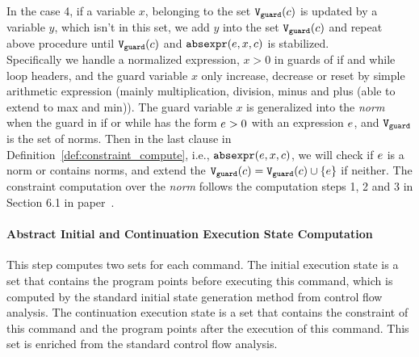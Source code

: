 %
In the case 4, if a variable $x$, belonging to the set 
  $\mathtt{V}_{\mathtt{guard}}(c)$ is updated by a variable $y$, which isn't in this set, 
  we add $y$ into the set $\mathtt{V}_{\mathtt{guard}}(c)$ and repeat 
  above procedure  until $\mathtt{V}_{\mathtt{guard}}(c)$ and $\mathtt{abs}{\mathtt{expr}}(e, x, c)$ is stabilized. 
  \\
Specifically 
we handle a 
normalized expression, $x > 0$
in guards of if and while loop headers, and 
the guard variable $x$ only increase, decrease or reset by 
simple arithmetic expression (mainly multiplication, division, minus and plus (able to extend to max and min)). 
The guard variable $x$ is generalized into the \emph{norm} when the guard 
in if or while has the form $e > 0$ with an expression $e$, and $\mathtt{V}_{\mathtt{guard}}$ is the set of norms.
Then in the last clause in Definition~\ref{def:constraint_compute}, i.e., $\mathtt{abs}{\mathtt{expr}}(e, x, c)$,
we will check if $e$ is a norm or contains norms, and extend the $\mathtt{V}_{\mathtt{guard}}(c)= \mathtt{V}_{\mathtt{guard}}(c)\cup \{e\}$ if neither.
The constraint computation over the \emph{norm} follows the computation steps 1, 2 and 3 in Section 6.1 in paper~\cite{SinnZV17}. 
%
\paragraph{Abstract Initial and Continuation Execution State Computation}
This step computes two sets for each command. 
The initial execution state is a set that contains the
program points before executing this command, which is computed by the standard initial state generation method from control flow analysis.
The continuation execution state is a set
that contains the constraint of this command and the program points after the execution of this command.
This set is enriched 
from the standard control flow analysis.

